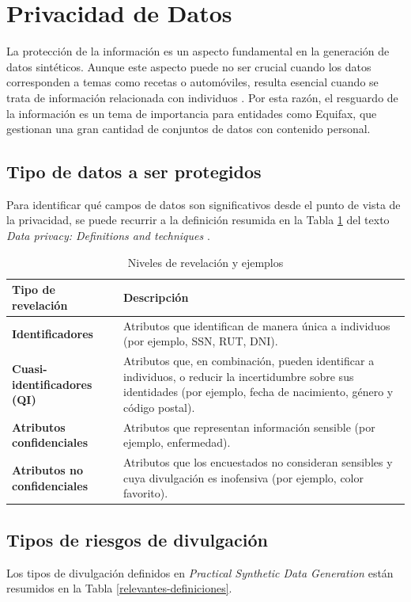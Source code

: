 \section{Privacidad de Datos}
La protección de la información es un aspecto fundamental en la generación de datos sintéticos. Aunque este aspecto puede no ser crucial cuando los datos corresponden a temas como recetas o automóviles, resulta esencial cuando se trata de información relacionada con individuos \cite{bruce_practical_2020}. Por esta razón, el resguardo de la información es un tema de importancia para entidades como Equifax, que gestionan una gran cantidad de conjuntos de datos con contenido personal.

\subsection{Tipo de datos a ser protegidos}
Para identificar qué campos de datos son significativos desde el punto de vista de la privacidad, se puede recurrir a la definición resumida en la Tabla \ref{data-relevante} del texto \emph{Data privacy: Definitions and techniques} \cite{de_capitani_di_vimercati_data_2012}.

\begin{table}[H]
	\centering
	\caption{Niveles de revelación y ejemplos}
	\label{data-relevante}
    \begin{tabular}{|m{15em}|m{20em}|}
    \hline
    \rowcolor[gray]{0.8}
    Tipo de revelación & Descripción \\
    \hline
    \textbf{Identificadores} 
    & Atributos que identifican de manera única a individuos (por ejemplo, SSN, RUT, DNI). \\
    \hline
    \textbf{Cuasi-identificadores (QI)} 
    & Atributos que, en combinación, pueden identificar a individuos, o reducir la incertidumbre sobre sus identidades (por ejemplo, fecha de nacimiento, género y código postal). \\
    \hline
    \textbf{Atributos confidenciales} 
    & Atributos que representan información sensible (por ejemplo, enfermedad). \\
    \hline
    \textbf{Atributos no confidenciales} 
    & Atributos que los encuestados no consideran sensibles y cuya divulgación es inofensiva (por ejemplo, color favorito). \\
    \hline
    \end{tabular}
\end{table}

\subsection{Tipos de riesgos de divulgación}
Los tipos de divulgación definidos en \emph{Practical Synthetic Data Generation} \cite{bruce_practical_2020} están resumidos en la Tabla \ref{relevantes-definiciones}.

